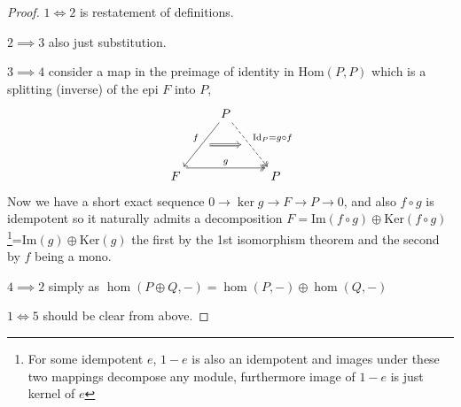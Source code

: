 \documentclass[12pt]{article}
\numberwithin{equation}{section}
\newcommand{\Hom}{{\mathrm{Hom}}}
\newcommand{\image}{{\mathrm{Im}}}
\newcommand{\kernel}{{\mathrm{Ker}}}
\begin{document}
	\begin{proof}
		$1 \iff 2$ is restatement of definitions.
		
		$2 \implies 3$ also just substitution.
		
	$3 \implies 4$ consider a map in the preimage of identity in $\Hom(P,P)$ which is a splitting (inverse) of the epi $F$ into $P$,
	\[\begin{tikzcd}
		& P \\
		\\
		F && P
		\arrow["g", shift left=3, two heads, from=3-1, to=3-3]
		\arrow[""{name=0, anchor=center, inner sep=0}, "f"', from=1-2, to=3-1]
		\arrow[""{name=1, anchor=center, inner sep=0}, "{\mathrm{Id}_P=g \circ f}", dashed, two heads, from=1-2, to=3-3]
	\arrow[shorten <=6pt, shorten >=6pt, Rightarrow, from=0, to=1]
	\end{tikzcd}\]
	Now we have a short exact sequence $0 \to \ker g \to F \to P \to 0$, and also $f\circ g $ is idempotent so it naturally admits a decomposition $F = \image(f \circ g) \oplus \kernel (f \circ g)$\footnote{For some idempotent $e$, $1-e$ is also an idempotent and images under these two mappings decompose any module, furthermore image of $1-e$ is just kernel of $e$}=$\image (g) \oplus \kernel (g)$ the first by the 1st isomorphism theorem and the second by $f $ being a mono.
	
	$4 \implies 2$ simply as $\hom (P \oplus Q,-) = \hom(P,-) \oplus \hom(Q,-)$
	
	$1 \iff 5$ should be clear from above.
			
	\end{proof}
	
\end{document}
